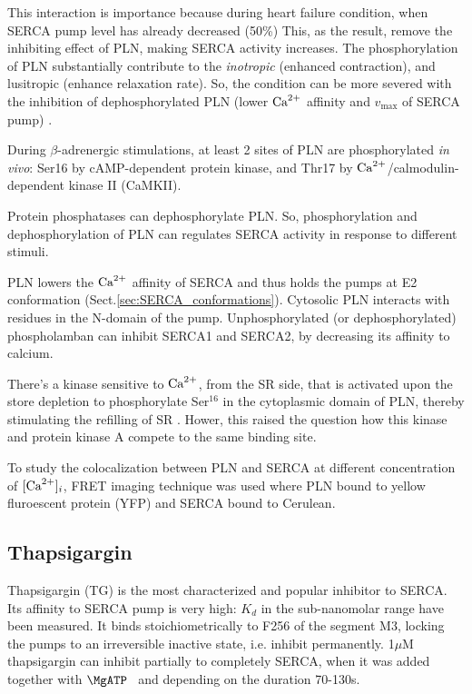 This interaction is importance because during heart failure condition, when
SERCA pump level has already decreased (50\%) This, as the result, remove the
inhibiting effect of PLN, making SERCA activity increases. The phosphorylation
of PLN substantially contribute to the {\it inotropic} (enhanced contraction),
and lusitropic (enhance relaxation rate).
So, the condition can be more severed with the inhibition of dephosphorylated
PLN (lower ${\text{Ca}^{2+}}$ affinity and $v_\max$ of SERCA pump) \citep{dash2001}.
 
\begin{framed}
During $\beta$-adrenergic stimulations, at least 2 sites of PLN are
phosphorylated {\it in vivo}: Ser16 by cAMP-dependent protein kinase,
and Thr17 by ${\text{Ca}^{2+}}$/calmodulin-dependent kinase II (CaMKII). 

Protein phosphatases can dephosphorylate PLN. So, phosphorylation and
dephosphorylation of PLN can regulates SERCA activity in response to different
stimuli.
\end{framed}

PLN lowers the ${\text{Ca}^{2+}}$ affinity of SERCA and thus holds the pumps at E2
conformation (Sect.\ref{sec:SERCA_conformations}). Cytosolic PLN interacts with residues
in the N-domain of the pump.  Unphosphorylated (or dephosphorylated)
phospholamban can inhibit SERCA1 and SERCA2, by decreasing its affinity to
calcium.


\begin{framed}

There's a kinase sensitive to ${\text{Ca}^{2+}}$, from the SR side, that is activated upon
the store depletion to phosphorylate Ser$^{16}$ in the cytoplasmic domain of
PLN, thereby stimulating the refilling of SR \citep{bhogal1998}. Hower, this
raised the question how this kinase and protein kinase A compete to the same
binding site.
\end{framed}

To study the colocalization between PLN and SERCA at different concentration of
$[{\text{Ca}^{2+}}]_i$, FRET imaging technique was used \citep{bidwell2011} where PLN bound
to yellow fluroescent protein (YFP) and SERCA bound to Cerulean. 


\subsection{Thapsigargin}
\label{sec:thapsigargin_SERCA}

Thapsigargin (TG) is the most characterized and popular inhibitor to SERCA. Its
affinity to SERCA pump is very high: $K_d$ in the sub-nanomolar range have been
measured. It binds stoichiometrically to F256 of the segment M3, locking the
pumps to an irreversible inactive state, i.e. inhibit permanently. 1$\mu$M
thapsigargin can inhibit partially to completely SERCA, when it was added
together with $\MgATP$~\citep{yano2000} and depending on the duration
70-130s\citep{bode2011}.


